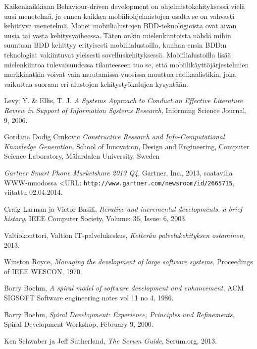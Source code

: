 \documentclass[finnish,nonumbib,nocopyright]{gradu2}
\begin{document}
Kaikenkaikkiaan Behaviour-driven development on ohjelmistokehityksessä vielä uusi menetelmä, ja ennen kaikkea mobiiliohjelmistojen osalta se on vahvasti kehittyvä menetelmä. Monet mobiilialustojen BDD-teknologioista ovat aivan uusia tai vasta kehitysvaiheessa. Täten onkin mielenkiintoista nähdä mihin suuntaan BDD kehittyy erityisesti mobiilialustoilla, kunhan ensin BDD:n teknologiat vakiintuvat yleisesti sovelluskehityksessä. Mobiilialustoilla lisää mielenkiintoa tulevaisuudessa tilanteeseen tuo se, että mobiilikäyttöjärjestelmien markkinatkin voivat vain muutamissa vuosissa muuttua radikaalistikin, joka vaikuttaa suoraan eri alustojen kehitystyökalujen kysyntään.

\begin{thebibliography}{9} %

Levy, Y. \& Ellis, T. J. \textit{A Systems Approach to Conduct an Effective Literature Review in Support of Information Systems Research},
Informing Science Journal, 9, 2006.

Gordana Dodig Crnkovic \textit{Constructive Research and Info-Computational Knowledge Generation},
School of Innovation, Design and Engineering, Computer Science Laboratory, Mälardalen University, Sweden

\textit{Gartner Smart Phone Marketshare 2013 Q4}, Gartner, Inc., 2013, saatavilla WWW-muodossa
<URL: \texttt{http://www.gartner.com/newsroom/id/2665715}, viitattu 02.04.2014.

Craig Larman ja Victor Basili, \textit{Iterative and incremental developments. a brief history},
IEEE Computer Society, Volume: 36, Issue: 6, 2003.

Valtiokonttori, Valtion IT-palvelukeskus, \textit{Ketterän palvelukehityksen ostaminen}, 2013. 

Winston Royce, \textit{Managing the development of large software systems},
Proceedings of IEEE WESCON, 1970.

Barry Boehm, \textit{A spiral model of software development and enhancement},
ACM SIGSOFT Software engineering notes vol 11 no 4, 1986.

Barry Boehm, \textit{Spiral Development: Experience, Principles and Refinements},
Spiral Development Workshop, February 9, 2000.

Ken Schwaber ja Jeff Sutherland, \textit{The Scrum Guide}, Scrum.org, 2013.


\end{thebibliography}
\end{document}
